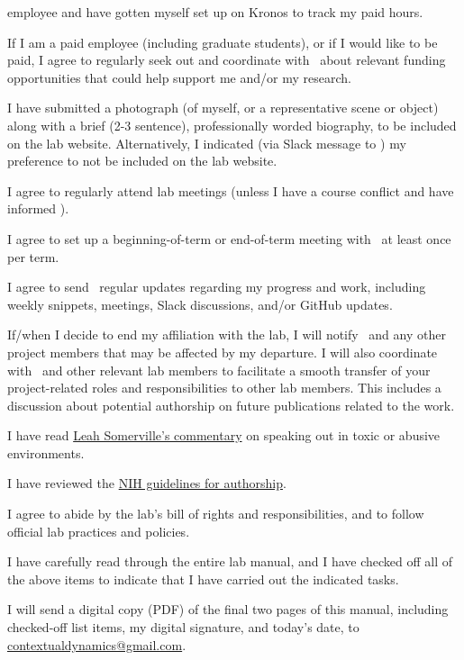 \documentclass{tufte-book} %
\begin{document}
\begin{todolist}
    employee and have gotten myself set up on Kronos to track my paid
    hours.
    \item If I am a paid employee (including graduate students), or if
      I would like to be paid, I agree to regularly seek out and
      coordinate with \director~about relevant funding opportunities
      that could help support me and/or my research.
  \item I have submitted a photograph (of myself, or a representative
    scene or object) along with a brief (2-3 sentence), professionally
    worded biography, to be included on the lab website.
    Alternatively, I indicated (via Slack message to \coordinator) my
    preference to not be included on the lab website.
  \item I agree to regularly attend lab meetings (unless I have a
    course conflict and have informed \director).
  \item I agree to set up a beginning-of-term or end-of-term meeting
    with \director~at least once per term.
    \item I agree to send \director~regular updates regarding my
      progress and work, including weekly snippets, meetings, Slack
      discussions, and/or GitHub updates.
      \item If/when I decide to end my affiliation with the lab, I
        will notify \director~and any other project members that may
        be affected by my departure.  I will also coordinate with
        \director~and other relevant lab members to facilitate a smooth
        transfer of your project-related roles and responsibilities to
        other lab members.  This includes a discussion about potential
        authorship on future publications related to the work.
  \item I have read
    \href{https://www.sciencemag.org/careers/2018/11/what-can-we-learn-dartmouth}{Leah
      Somerville's commentary} on speaking out in toxic or abusive
    environments.
  \item I have reviewed the
    \href{https://oir.nih.gov/sites/default/files/uploads/sourcebook/documents/ethical_conduct/guidelines-authorship_contributions.pdf}{NIH
      guidelines for authorship}.
  \item I agree to abide by the lab's bill of rights and
    responsibilities, and to follow official lab practices and
    policies.
  \item I have carefully read through the entire lab manual, and I
    have checked off all of the above items to indicate that I have
    carried out the indicated tasks.
  \item I will send a digital copy (PDF) of the final two pages of
    this manual, including checked-off list items, my digital
    signature, and today's date, to
    \href{mailto:contextualdynamics@gmail.com}{contextualdynamics@gmail.com}.
\end{todolist}
\end{document}
